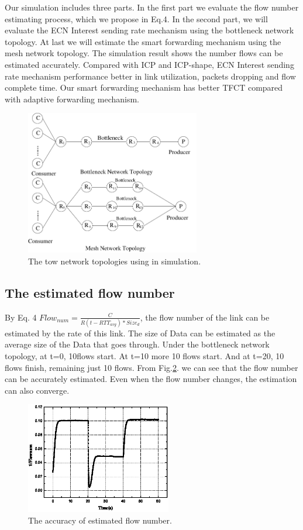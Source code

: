 Our simulation includes three parts. In the first part we evaluate the flow number estimating process, which we propose in Eq.4. In the second part, we will evaluate the ECN Interest sending rate mechanism using the bottleneck network topology. At last we will estimate the smart forwarding mechanism using the mesh network topology. The simulation result shows the number flows can be estimated accurately. Compared with ICP and ICP-shape, ECN Interest sending rate mechanism performance better in link utilization, packets dropping and flow complete time. Our smart forwarding mechanism has better TFCT compared with adaptive forwarding mechanism.
\begin{figure}[t]
\centering
\includegraphics[width=3in]{topology.pdf}
\centering
\caption{The tow network topologies using in simulation.}
\label{fig-topology}
\end{figure}
\subsection{The estimated flow number}
By Eq. 4 $Flow_{num}=\frac{C}{R(t-RTT_{avg})\ast{Size_{d}}}$, the flow number of the link can be estimated by the rate of this link. The size of Data can be estimated as the average size of the Data that goes through. Under the bottleneck network topology, at t=0, 10flows start. At t=10 more 10 flows start. And at t=20, 10 flows finish, remaining just 10 flows. From Fig.\ref{fig-flownum}. we can see that the flow number can be accurately estimated. Even when the flow number changes, the estimation can also converge.
\begin{figure}[t]
\centering
\includegraphics[width=2.5in]{flownum-pic-cut.eps}
\centering
\caption{The accuracy of estimated flow number.}
\label{fig-flownum}
\end{figure}

